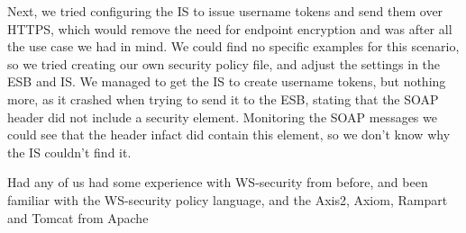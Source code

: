 Next, we tried configuring the IS to issue username tokens and send them over HTTPS, which would remove the need for endpoint encryption and was after all the use case we had in mind. We could find no specific examples for this scenario, so we tried creating our own security policy file, and adjust the settings in the ESB and IS. We managed to get the IS to create username tokens, but nothing more, as it crashed when trying to send it to the ESB, stating that the SOAP header did not include a security element. Monitoring the SOAP messages we could see that the header infact did contain this element, so we don't know why the IS couldn't find it. 

Had any of us had some experience with WS-security from before, and been familiar with the WS-security policy language, and the Axis2, Axiom, Rampart and Tomcat from Apache
